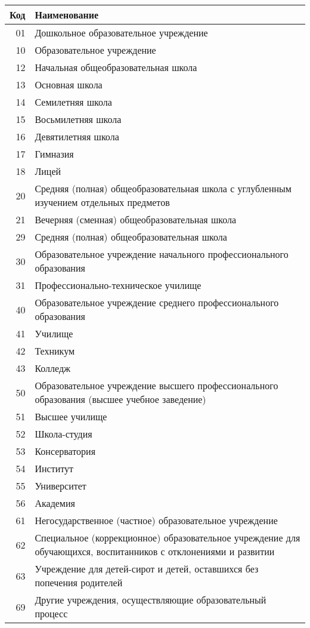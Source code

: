 \documentclass[10pt, a4paper, titlepage]{article}
\begin{document}
\begin{center}
    \begin{longtable}{rp{}}
        \hline
        \textbf{Код} & \textbf{Наименование} \\ \hline
        01 & Дошкольное образовательное учреждение \\
        10 & Образовательное учреждение \\
        12 & Начальная общеобразовательная школа \\
        13 & Основная школа \\
        14 & Семилетняя школа \\
        15 & Восьмилетняя школа \\
        16 & Девятилетняя школа \\
        17 & Гимназия \\
        18 & Лицей \\
        20 & Средняя (полная) общеобразовательная школа с углубленным изучением отдельных предметов \\
        21 & Вечерняя (сменная) общеобразовательная школа \\
        29 & Средняя (полная) общеобразовательная школа \\
        30 & Образовательное учреждение начального профессионального образования \\
        31 & Профессионально-техническое училище \\
        40 & Образовательное учреждение среднего профессионального образования \\
        41 & Училище \\
        42 & Техникум \\
        43 & Колледж \\
        50 & Образовательное учреждение высшего профессионального образования (высшее учебное заведение) \\
        51 & Высшее училище \\
        52 & Школа-студия \\
        53 & Консерватория \\
        54 & Институт \\
        55 & Университет \\
        56 & Академия \\
        61 & Негосударственное (частное) образовательное учреждение \\
        62 & Специальное (коррекционное) образовательное учреждение для обучающихся, воспитанников с отклонениями и развитии \\
        63 & Учреждение для детей-сирот и детей, оставшихся без попечения родителей \\
        69 & Другие учреждения, осуществляющие образовательный процесс \\
    \end{longtable}
\end{center}
\end{document}
